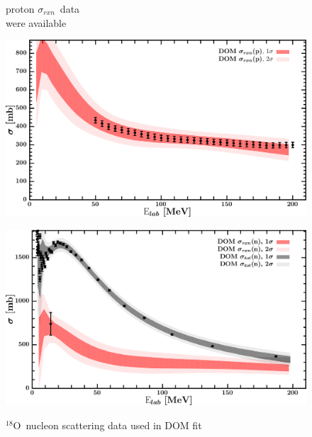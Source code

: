 \documentclass[twocolumn,secnumarabic,amssymb, nobibnotes, aps, prl,
superscriptaddress, nobalancelastpage]{revtex4}
\newcommand{\rxn}{\ensuremath{\sigma_{rxn}}}
\newcommand{\oEight}{\ensuremath{^{18}}O}
\begin{document}
\begin{figure}[!htb]
\begin{minipage}{0.4\linewidth}
\begin{minipage}[c]{0.4\linewidth}
            proton \rxn\ data\\
            were available
        \end{minipage}
        \label{DOM_o18_neutron_elastic}
    \end{minipage}
    \centering
    \begin{minipage}{0.4\linewidth}
        \centering
        \includegraphics[width=\linewidth]{figures/o18_protonInelastic.png}
        \label{DOM_o18_proton_inelastic}
    \end{minipage}\hspace{6pt}
    \begin{minipage}{0.4\linewidth}
        \centering
        \includegraphics[width=\linewidth]{figures/o18_neutronInelastic.png}
        \label{DOM_o18_neutron_inelastic}
    \end{minipage}
    \caption{\oEight\ nucleon scattering data used in DOM fit}
    \label{DOM_o18_scattering}
    \centering
    \begin{minipage}{0.4\linewidth}
        \centering

\end{minipage}
\end{figure}
\end{document}
